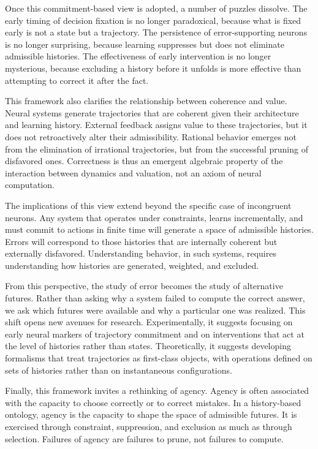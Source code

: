 \documentclass[11pt]{article}
\begin{document}
Once this commitment-based view is adopted, a number of puzzles dissolve. The early timing of decision fixation is no longer paradoxical, because what is fixed early is not a state but a trajectory. The persistence of error-supporting neurons is no longer surprising, because learning suppresses but does not eliminate admissible histories. The effectiveness of early intervention is no longer mysterious, because excluding a history before it unfolds is more effective than attempting to correct it after the fact.

This framework also clarifies the relationship between coherence and value. Neural systems generate trajectories that are coherent given their architecture and learning history. External feedback assigns value to these trajectories, but it does not retroactively alter their admissibility. Rational behavior emerges not from the elimination of irrational trajectories, but from the successful pruning of disfavored ones. Correctness is thus an emergent algebraic property of the interaction between dynamics and valuation, not an axiom of neural computation.

The implications of this view extend beyond the specific case of incongruent neurons. Any system that operates under constraints, learns incrementally, and must commit to actions in finite time will generate a space of admissible histories. Errors will correspond to those histories that are internally coherent but externally disfavored. Understanding behavior, in such systems, requires understanding how histories are generated, weighted, and excluded.

From this perspective, the study of error becomes the study of alternative futures. Rather than asking why a system failed to compute the correct answer, we ask which futures were available and why a particular one was realized. This shift opens new avenues for research. Experimentally, it suggests focusing on early neural markers of trajectory commitment and on interventions that act at the level of histories rather than states. Theoretically, it suggests developing formalisms that treat trajectories as first-class objects, with operations defined on sets of histories rather than on instantaneous configurations.

Finally, this framework invites a rethinking of agency. Agency is often associated with the capacity to choose correctly or to correct mistakes. In a history-based ontology, agency is the capacity to shape the space of admissible futures. It is exercised through constraint, suppression, and exclusion as much as through selection. Failures of agency are failures to prune, not failures to compute.
\end{document}
